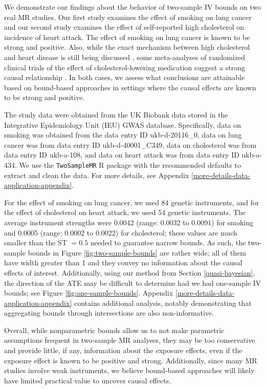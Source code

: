 \documentclass[
]{article}
\theoremstyle{plain}
\begin{document}
We demonstrate our findings about the behavior of two-sample IV bounds on two real MR studies. Our first study examines the effect of smoking on lung cancer and our second study examines the effect of self-reported high cholesterol on incidence of heart attack. The effect of smoking on lung cancer is known to be strong and positive. Also, while the exact mechanism between high cholesterol and heart disease is still being discussed \autocite{holmes_mendelian_2015,richardson_evaluating_2020}, some meta-analyses of randomized clinical trials of the effect of cholesterol-lowering medication suggest a strong causal relationship \autocite{20051267,cholesterol_treatment_trialists_ctt_collaborators_effects_2012}. In both cases, we assess what conclusions are attainable based on bound-based approaches in settings where the causal effects are known to be strong and positive.

The study data were obtained from the UK Biobank data stored in the Integrative Epidemiology Unit (IEU) GWAS database. Specifically, data on smoking was obtained from the data entry ID ukb-d-20116\_0, data on lung cancer was from data entry ID ukb-d-40001\_C349, data on cholesterol was from data entry ID ukb-a-108, and data on heart attack was from data entry ID ukb-a-434. We use the \texttt{TwoSampleMR} R package \autocite{mrbase} with the recommended defaults to extract and clean the data. For more details, see Appendix \ref{more-details-data-application-appendix}.

For the effect of smoking on lung cancer, we used 84 genetic instruments, and for the effect of cholesterol on heart attack, we used 54 genetic instruments. The average instrument strengths were 0.0042 (range: 0.0032 to 0.0091) for smoking and 0.0005 (range: 0.0002 to 0.0022) for cholesterol; these values are much smaller than the ST \(= 0.5\) needed to guarantee narrow bounds. As such, the two-sample bounds in Figure \ref{fig:two-sample-bounds} are rather wide; all of them have width greater than 1 and they convey no information about the causal effects of interest. Additionally, using our method from Section \ref{quasi-bayesian}, the direction of the ATE may be difficult to determine had we had one-sample IV bounds; see Figure \ref{fig:one-sample-bounds}. Appendix \ref{more-details-data-application-appendix} contains additional analysis, notably demonstrating that aggregating bounds through intersections are also non-informative.

Overall, while nonparametric bounds allow us to not make parametric assumptions frequent in two-sample MR analyses, they may be too conservative and provide little, if any, information about the exposure effects, even if the exposure effect is known to be positive and strong. Additionally, since many MR studies involve weak instruments, we believe bound-based approaches will likely have limited practical value to uncover causal effects.
\end{document}
